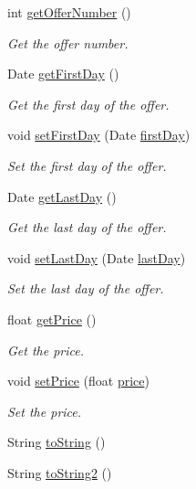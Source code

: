 \begin{DoxyCompactItemize}
int \mbox{\hyperlink{classdomain_1_1_offer_ab9e27c474ec6819a27eac1847d876c3a}{get\+Offer\+Number}} ()
\begin{DoxyCompactList}\small\item\em Get the offer number. \end{DoxyCompactList}\item 
Date \mbox{\hyperlink{classdomain_1_1_offer_ae13ac55ba469cb34e004d6aff68430fb}{get\+First\+Day}} ()
\begin{DoxyCompactList}\small\item\em Get the first day of the offer. \end{DoxyCompactList}\item 
void \mbox{\hyperlink{classdomain_1_1_offer_aca5c8e3d34e700c8e51d1c9a0685e68f}{set\+First\+Day}} (Date \mbox{\hyperlink{classdomain_1_1_offer_ac30c7d7ca38555fecc523259c15bd6b0}{first\+Day}})
\begin{DoxyCompactList}\small\item\em Set the first day of the offer. \end{DoxyCompactList}\item 
Date \mbox{\hyperlink{classdomain_1_1_offer_a8bf48365a8fc185dbdcaac80a9d84444}{get\+Last\+Day}} ()
\begin{DoxyCompactList}\small\item\em Get the last day of the offer. \end{DoxyCompactList}\item 
void \mbox{\hyperlink{classdomain_1_1_offer_a52363278771059c51820160889c2bed1}{set\+Last\+Day}} (Date \mbox{\hyperlink{classdomain_1_1_offer_a4d415274c0e120dd3e66e4ad46d7e2b2}{last\+Day}})
\begin{DoxyCompactList}\small\item\em Set the last day of the offer. \end{DoxyCompactList}\item 
float \mbox{\hyperlink{classdomain_1_1_offer_a4ebf9c6f415709b527e006fdffa3a0c3}{get\+Price}} ()
\begin{DoxyCompactList}\small\item\em Get the price. \end{DoxyCompactList}\item 
void \mbox{\hyperlink{classdomain_1_1_offer_a8bd526902732e030571b6889c5507f4c}{set\+Price}} (float \mbox{\hyperlink{classdomain_1_1_offer_a194cfe9363c5bd9e745f56978b03e7fd}{price}})
\begin{DoxyCompactList}\small\item\em Set the price. \end{DoxyCompactList}\item 
String \mbox{\hyperlink{classdomain_1_1_offer_a8838b2d4c6616394f1829d4dc5572952}{to\+String}} ()
\item 
String \mbox{\hyperlink{classdomain_1_1_offer_a9e4e8be92a6caa7756cb8277df32c17b}{to\+String2}} ()
\end{DoxyCompactItemize}
